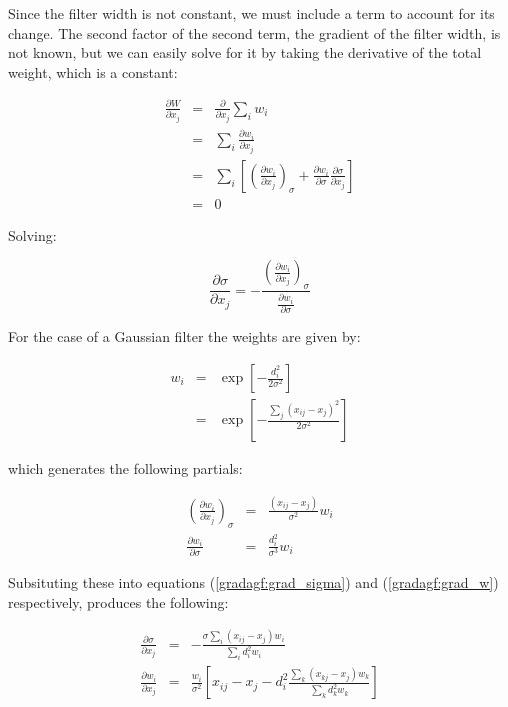 \documentclass[12pt]{report}
\begin{document}
\begin{flushleft}
Since the filter width is not constant, we must include a term to account for its change.
The second factor of the second term, the gradient of the filter width, is not known,
but we can easily solve for it by taking the derivative of the total weight, which is
a constant:

\begin{eqnarray}
  \frac{\partial W}{\partial x_j} & = & \frac{\partial}{\partial x_j} \sum_i w_i \\
  & = & \sum_i \frac{\partial w_i}{\partial x_j} \\
  & = & \sum_i \left [\left (\frac{\partial w_i}{\partial x_j} \right )_\sigma
                + \frac{\partial w_i}{\partial \sigma} 
		\frac{\partial \sigma}{\partial x_j} \right ] \\
  & = & 0
\end{eqnarray}

Solving:

\begin{equation}
  \frac{\partial \sigma}{\partial x_j} = - \frac
		{\left (\frac{\partial w_i}{\partial x_j} \right )_\sigma}
		{\frac{\partial w_i}{\partial \sigma}}
  \label{gradagf:grad_sigma}
\end{equation}

For the case of a Gaussian filter the weights are given by:

\begin{eqnarray}
  w_i & = & \exp \left [ - \frac{d_i^2}{2 \sigma^2} \right ] \\
  	& = & \exp \left [ - \frac{\sum_j (x_{ij} - x_j)^2}{2 \sigma^2} \right ]
\end{eqnarray}

which generates the following partials:

\begin{eqnarray}
  \left (\frac{\partial w_i}{\partial x_j} \right )_\sigma & = &
		 \frac{(x_{ij} - x_j)}{\sigma^2} w_i \\
  {\frac{\partial w_i}{\partial \sigma}} & = & \frac{d_i^2}{\sigma^3} w_i
\end{eqnarray}

Subsituting these into equations (\ref{gradagf:grad_sigma}) and 
(\ref{gradagf:grad_w}) respectively, produces the following:

\begin{eqnarray}
  \frac{\partial \sigma}{\partial x_j} & = & - \frac{\sigma \sum_i (x_{ij} - x_j) w_i}
		{\sum_i d_i^2 w_i} \\
  \frac{\partial w_i}{\partial x_j} & = & \frac{w_i}{\sigma^2} \left [x_{ij} - x_j 
		- d_i^2 \frac{\sum_k (x_{kj} - x_j) w_k} {\sum_k d_k^2 w_k} \right ]
\end{eqnarray}


\end{flushleft}
\end{document}
